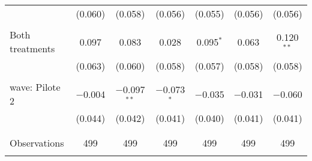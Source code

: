 \begin{tabular}{@{\extracolsep{5pt}}lcccccc}
  & (0.060) & (0.058) & (0.056) & (0.055) & (0.056) & (0.056) \\ 
  & & & & & & \\ 
 Both treatments & 0.097 & 0.083 & 0.028 & 0.095$^{*}$ & 0.063 & 0.120$^{**}$ \\ 
  & (0.063) & (0.060) & (0.058) & (0.057) & (0.058) & (0.058) \\ 
  & & & & & & \\ 
 wave: Pilote 2 & $-$0.004 & $-$0.097$^{**}$ & $-$0.073$^{*}$ & $-$0.035 & $-$0.031 & $-$0.060 \\ 
  & (0.044) & (0.042) & (0.041) & (0.040) & (0.041) & (0.041) \\ 
  & & & & & & \\ 
\hline \\[-1.8ex] 

Observations & 499 & 499 & 499 & 499 & 499 & 499 \\ 
\hline 
\hline \\[-1.8ex] 
\end{tabular} 